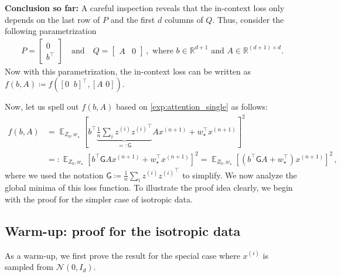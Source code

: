 \documentclass{article}
\DeclareMathOperator{\E}{\mathbb{E}}
\newcommand{\R}{\mathbb{R}}
\newcommand{\bb}{A}
\newcommand{\cc}{b}
\newcommand{\wstar}{w_\star}
\newcommand{\tz}[1]{{z^{(#1)}}}
\newcommand{\tx}[1]{x^{(#1)}}
\newcommand{\MM}{\mathsf{G}}
\begin{document}
\begin{mdframed}[linecolor=black!40,linewidth=0.5pt,innertopmargin=3pt,innerleftmargin=3pt,innerrightmargin=3pt,innerbottommargin=3pt]
\textbf{Conclusion so far:} A careful inspection reveals that the in-context loss  only depends on the last row of $P$ and the first $d$ columns of $Q$. 
Thus, consider the following parametrization
\begin{align} \label{exp:simplify}
P = \begin{bmatrix}
0\\
\cc^\top
\end{bmatrix}\quad \text{and} \quad Q=\begin{bmatrix}
\bb & 0 
\end{bmatrix}\,, \text{ where $\cc\in\R^{d+1}$ and $\bb\in \R^{(d+1)\times d}$}.
\end{align}
Now with this parametrization, the in-context loss can be written as $f(\cc,\bb) \coloneqq  f([0 \,\,\ \cc]^\top, [\bb \,\, 0])$.  
\end{mdframed}

Now, let us spell out $f(\cc,\bb)$ based on \eqref{exp:attention_single} as follows:
\begin{align}
f(\cc,\bb) &= \E_{Z_0,\wstar} \left[\cc^\top \underbrace{\frac{1}{n}  \sum_i \tz{i} {\tz{i}}^\top}_{=:\MM} \bb \tx{n+1} + \wstar^\top \tx{n+1} \right]^2 \\
& =: \E_{Z_0,\wstar} \left[\cc^\top \MM \bb \tx{n+1} + \wstar^\top \tx{n+1} \right]^2 = \E_{Z_0,\wstar} \left[(\cc^\top \MM \bb   + \wstar^\top) \tx{n+1} \right]^2 \,, \label{exp:loss_single}
\end{align}
where we used the notation $\MM \coloneqq \frac{1}{n}  \sum_i \tz{i} {\tz{i}}^\top$ to simplify.
We now analyze the global minima of this loss function.
To illustrate the proof idea clearly, we begin with the proof for the simpler case of isotropic data.

\subsection{Warm-up: proof for the isotropic data} \label{e:single_layer_non_isotropic_proof}


As a warm-up, we first prove the result for the special case where  $\tx{i}$ is sampled from $\mathcal{N}(0, I_d)$.  
\end{document}
